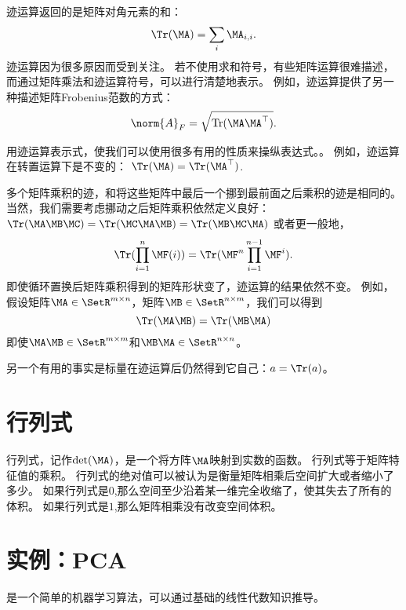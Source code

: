 迹运算返回的是矩阵对角元素的和：
\begin{equation}
    \Tr(\MA)= \sum_i \MA_{i,i}.
\end{equation}
迹运算因为很多原因而受到关注。
若不使用求和符号，有些矩阵运算很难描述，而通过矩阵乘法和迹运算符号，可以进行清楚地表示。
例如，迹运算提供了另一种描述矩阵Frobenius范数的方式：
\begin{equation}
    \norm{A}_F = \sqrt{\text{Tr}(\MA\MA^\top)}.
\end{equation}


用迹运算表示式，使我们可以使用很多有用的性质来操纵表达式。。
例如，迹运算在转置运算下是不变的：
$\Tr(\MA)=\Tr(\MA^\top)$.


多个矩阵乘积的迹，和将这些矩阵中最后一个挪到最前面之后乘积的迹是相同的。
当然，我们需要考虑挪动之后矩阵乘积依然定义良好：
$\Tr(\MA\MB\MC)=\Tr(\MC\MA\MB)= \Tr(\MB\MC\MA)$
或者更一般地，
\begin{equation}
\Tr(\prod_{i=1}^n \MF(i))= \Tr(\MF^n \prod_{i=1}^{n-1} \MF^i).
\end{equation}
即使循环置换后矩阵乘积得到的矩阵形状变了，迹运算的结果依然不变。
例如，假设矩阵$\MA\in \SetR^{m\times n}$，矩阵$\MB\in \SetR^{n\times m}$，我们可以得到
\begin{equation} 
    \Tr(\MA\MB)= \Tr(\MB\MA)
\end{equation}
即使$\MA\MB \in \SetR^{m\times m}$和$\MB\MA \in \SetR^{n\times n}$。



另一个有用的事实是标量在迹运算后仍然得到它自己：$a=\Tr(a)$。




\section{行列式}
\label{sec:the_determinant}

行列式，记作$\text{det}(\MA)$，是一个将方阵$\MA$映射到实数的函数。
行列式等于矩阵特征值的乘积。
行列式的绝对值可以被认为是衡量矩阵相乘后空间扩大或者缩小了多少。
如果行列式是$0$,那么空间至少沿着某一维完全收缩了，使其失去了所有的体积。
如果行列式是$1$,那么矩阵相乘没有改变空间体积。




\section{实例：\gls{PCA}}
\label{sec:principal_components_analysis}

是一个简单的机器学习算法，可以通过基础的线性代数知识推导。


